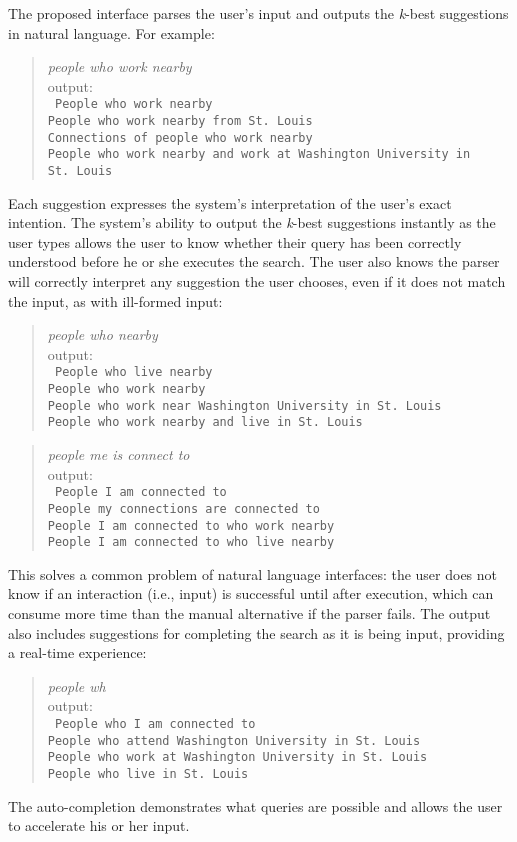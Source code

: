 \documentclass{article}
\begin{document}
The proposed interface parses the user's input and outputs the \textit{k}-best suggestions in natural language. For example:
\begin{quote}
\textit{people who work nearby}\\
output:\\
\texttt{
People who work nearby\\
People who work nearby from St.\ Louis\\
Connections of people who work nearby\\
People who work nearby and work at Washington University in St.\ Louis
}
\end{quote}
Each suggestion expresses the system's interpretation of the user's exact intention. The system's ability to output the \textit{k}-best suggestions instantly as the user types allows the user to know whether their query has been correctly understood before he or she executes the search. The user also knows the parser will correctly interpret any suggestion the user chooses, even if it does not match the input, as with ill-formed input:
\begin{quote}\textit{people who nearby}\\
output:\\
\texttt{
People who live nearby\\
People who work nearby\\
People who work near Washington University in St.\ Louis\\
People who work nearby and live in St.\ Louis
}
\end{quote}
\begin{quote}
\textit{people me is connect to}\\
output:\\
\texttt{
People I am connected to\\
People my connections are connected to\\
People I am connected to who work nearby\\
People I am connected to who live nearby
}
\end{quote}
This solves a common problem of natural language interfaces: the user does not know if an interaction (i.e., input) is successful until after execution, which can consume more time than the manual alternative if the parser fails. The output also includes suggestions for completing the search as it is being input, providing a real-time experience:
\begin{quote}
\textit{people wh}\\
output:\\
\texttt{
People who I am connected to\\
People who attend Washington University in St.\ Louis\\
People who work at Washington University in St.\ Louis\\
People who live in St.\ Louis
}
\end{quote}
The auto-completion demonstrates what queries are possible and allows the user to accelerate his or her input.
\end{document}
